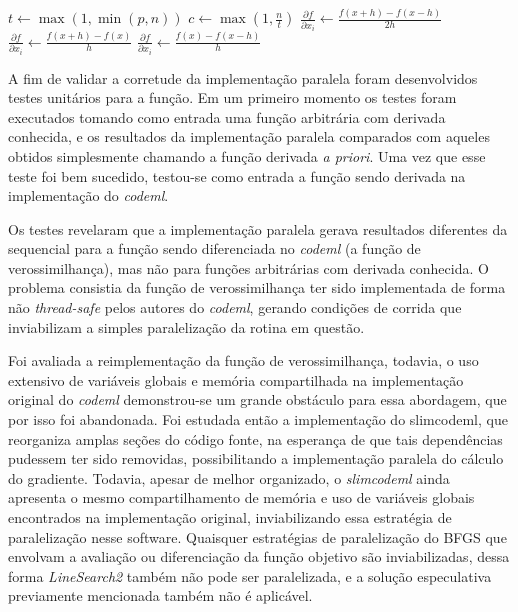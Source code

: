\documentclass[cic,tc]{iiufrgs}
\begin{document}
\begin{algorithmic}
\State $t \gets \max(1, \min(p, n))$
\State $c \gets \max(1, \frac{n}{t})$
    \State $\frac{\partial f}{\partial x_i} \gets \frac{f(x+h)-f(x-h)}{2h}$
    \State $\frac{\partial f}{\partial x_i} \gets \frac{f(x+h)-f(x)}{h}$
  \Else
    \State $\frac{\partial f}{\partial x_i} \gets \frac{f(x)-f(x-h)}{h}$
  \EndIf
\EndFor
\end{algorithmic}

A fim de validar a corretude da implementação paralela foram desenvolvidos
testes unitários para a função. Em um primeiro momento os testes foram
executados tomando como entrada uma função arbitrária com derivada conhecida,
e os resultados da implementação paralela comparados com aqueles obtidos
simplesmente chamando a função derivada \textit{a priori}. Uma vez que esse
teste foi bem sucedido, testou-se como entrada a função sendo derivada na
implementação do \textit{codeml}.

Os testes revelaram que a implementação paralela gerava resultados diferentes
da sequencial para a função sendo diferenciada no \textit{codeml} (a função de
verossimilhança), mas não para funções arbitrárias com derivada conhecida. O
problema consistia da função de verossimilhança ter sido implementada de forma
não \textit{thread-safe} pelos autores do \textit{codeml}, gerando condições de corrida
que inviabilizam a simples paralelização da rotina em questão.

Foi avaliada a reimplementação da função de verossimilhança, todavia, o
uso extensivo de variáveis globais e memória compartilhada na implementação
original do \textit{codeml} demonstrou-se um grande obstáculo para essa abordagem, que
por isso foi abandonada. Foi estudada então a implementação do slimcodeml, que
reorganiza amplas seções do código fonte, na esperança de que tais
dependências pudessem ter sido removidas, possibilitando a implementação
paralela do cálculo do gradiente. Todavia, apesar de melhor organizado, o
\textit{slimcodeml} ainda apresenta o mesmo compartilhamento de memória e uso de
variáveis globais encontrados na implementação original, inviabilizando essa
estratégia de paralelização nesse software. Quaisquer estratégias de
paralelização do BFGS que envolvam a avaliação ou diferenciação da função
objetivo são inviabilizadas, dessa forma \textit{LineSearch2} também não pode
ser paralelizada, e a solução especulativa previamente mencionada também não é
aplicável.
\end{document}
